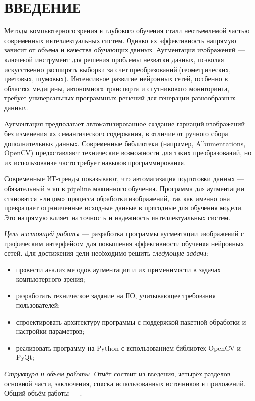 \section*{ВВЕДЕНИЕ}

Методы компьютерного зрения и глубокого обучения стали неотъемлемой частью современных интеллектуальных систем. Однако их эффективность напрямую зависит от объема и качества обучающих данных. Аугментация изображений — ключевой инструмент для решения проблемы нехватки данных, позволяя искусственно расширять выборки за счет преобразований (геометрических, цветовых, шумовых). Интенсивное развитие нейронных сетей, особенно в областях медицины, автономного транспорта и спутникового мониторинга, требует универсальных программных решений для генерации разнообразных данных.

Аугментация предполагает автоматизированное создание вариаций изображений без изменения их семантического содержания, в отличие от ручного сбора дополнительных данных. Современные библиотеки (например, Albumentations, OpenCV) предоставляют технические возможности для таких преобразований, но их использование часто требует навыков программирования.

Современные ИТ-тренды показывают, что автоматизация подготовки данных — обязательный этап в pipeline машинного обучения. Программа для аугментации становится «лицом» процесса обработки изображений, так как именно она превращает ограниченные исходные данные в пригодные для обучения модели. Это напрямую влияет на точность и надежность интеллектуальных систем.

\emph{Цель настоящей работы} — разработка программы аугментации изображений с графическим интерфейсом для повышения эффективности обучения нейронных сетей. Для достижения цели необходимо решить \emph{следующие задачи}:
\begin{itemize}
	\item провести анализ методов аугментации и их применимости в задачах компьютерного зрения;
	\item разработать техническое задание на ПО, учитывающее требования пользователей;
	\item спроектировать архитектуру программы с поддержкой пакетной обработки и настройки параметров;
	\item реализовать программу на Python с использованием библиотек OpenCV и PyQt;
\end{itemize}

\emph{Структура и объем работы.} Отчёт состоит из введения, четырёх разделов основной части, заключения, списка использованных источников и приложений. Общий объём работы — .

